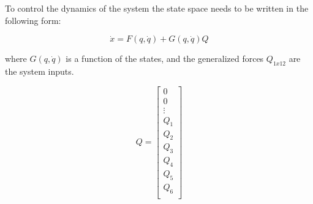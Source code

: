 \documentclass[10pt, letterpaper]{article}
\begin{document}
To control the dynamics of the system the state space needs to be written in the following form:

\[
\dot{x} = F(q,\dot{q}) + G(q,\dot{q}) Q
\]

where $G(q,\dot{q})$ is a function of the states, and the generalized forces $Q_{1x12}$ are the system inputs.

\[
Q = \left[\begin{array}{c}
0\\
0\\
\vdots\\
Q_{1}\\
Q_{2}\\
Q_{3}\\
Q_{4}\\
Q_{5}\\
Q_{6}\\
\end{array}\right]
\]
\end{document}
